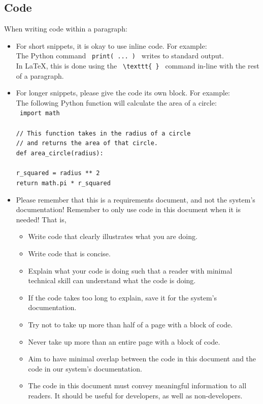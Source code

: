 \documentclass{scrreprt}
\begin{document}
\subsection{Code}
When writing code within a paragraph:
\begin{itemize}
    \item For short snippets, it is okay to use inline code. For example: \\
          The Python command \texttt{ print( ... ) } writes to standard output. \\
          In LaTeX, this is done using the \texttt{ \textbackslash texttt\{ \} } command in-line with the rest of a paragraph.
    \item For longer snippets, please give the code its own block. For example: \\
          The following Python function will calculate the area of a circle: \\
          \texttt{ import math \\
              \\
              // This function takes in the radius of a circle \\
              // and returns the area of that circle. \\
              def area\_circle(radius): \\
              \\
              r\_squared = radius ** 2 \\
              return math.pi * r\_squared \\
          }
    \item Please remember that this is a requirements document, and not the system's documentation!
          Remember to only use code in this document when it is needed!
          That is,
          \begin{itemize}
              \item Write code that clearly illustrates what you are doing.
              \item Write code that is concise.
              \item Explain what your code is doing such that a reader with minimal technical skill can understand what the code is doing.
              \item If the code takes too long to explain, save it for the system's documentation.
              \item Try not to take up more than half of a page with a block of code.
              \item Never take up more than an entire page with a block of code.
              \item Aim to have minimal overlap between the code in this document and the code in our system's documentation.
              \item The code in this document must convey meaningful information to all readers.
                    It should be useful for developers, as well as non-developers.
          \end{itemize}
\end{itemize}
$ $
\end{document}
